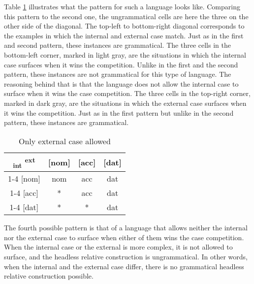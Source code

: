 Table \ref{tbl:case-competition-only-ext} illustrates what the pattern for such a language looks like. Comparing this pattern to the second one, the ungrammatical cells are here the three on the other side of the diagonal.
The top-left to bottom-right diagonal corresponds to the examples in which the internal and external case match. Just as in the first and second pattern, these instances are grammatical.
The three cells in the bottom-left corner, marked in light gray, are the situations in which the internal case surfaces when it wins the competition. Unlike in the first and the second pattern, these instances are not grammatical for this type of language. The reasoning behind that is that the language does not allow the internal case to surface when it wins the case competition.
The three cells in the top-right corner, marked in dark gray, are the situations in which the external case surfaces when it wins the competition. Just as in the first pattern but unlike in the second pattern, these instances are grammatical.

\begin{table}[H]
  \center
  \caption{Only external case allowed}
  \begin{tabular}{c|c|c|c}
    \toprule
    \textsubscript{\ac{int}} \textsuperscript{\ac{ext}}
           & [\ac{nom}]
           & [\ac{acc}]
           & [\ac{dat}]
           \\ \cmidrule{1-4}
       [\ac{nom}]
           & \ac{nom}
           & \cellcolor{DG}\ac{acc}
           & \cellcolor{DG}\ac{dat}
           \\ \cmidrule{1-4}
       [\ac{acc}]
           & \cellcolor{LG}*
           & \ac{acc}
           & \cellcolor{DG}\ac{dat}
           \\ \cmidrule{1-4}
       [\ac{dat}]
           & \cellcolor{LG}*
           & \cellcolor{LG}*
           & \ac{dat}
           \\
     \bottomrule
  \end{tabular}
    \label{tbl:case-competition-only-ext}
\end{table}

The fourth possible pattern is that of a language that allows neither the internal nor the external case to surface when either of them wins the case competition. When the internal case or the external is more complex, it is not allowed to surface, and the headless relative construction is ungrammatical. In other words, when the internal and the external case differ, there is no grammatical headless relative construction possible.

